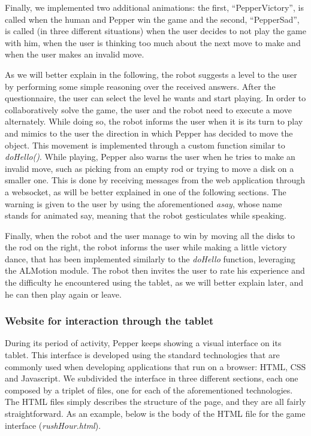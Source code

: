 \documentclass{article}
\begin{document}


Finally, we implemented two additional animations: the first, “PepperVictory”,  is called when the human and Pepper win the game and the second, “PepperSad”, is called (in three different situations) when the user decides to not play the game with him, when the user is thinking too much about the next move to make and when the user makes an invalid move. 








\noindent As we will better explain in the following, the robot suggests a level to the user by performing some simple reasoning over the received answers. After the questionnaire, the user can select the level he wants and start playing. In order to collaboratively solve the game, the user and the robot need to execute a move alternately. While doing so, the robot informs the user when it is its turn to play and mimics to the user the direction in which Pepper has decided to move the object. This movement is implemented through a custom function similar to \textit{doHello()}.
While playing, Pepper also warns the user when he tries to make an invalid move, such as picking from an empty rod or trying to move a disk on a smaller one. This is done by receiving messages from the web application through a websocket, as will be better explained in one of the following sections. The warning is given to the user by using the aforementioned \textit{asay}, whose name stands for animated say, meaning that the robot gesticulates while speaking.



\noindent Finally, when the robot and the user manage to win by moving all the disks to the rod on the right, the robot informs the user while making a little victory dance, that has been implemented similarly to the \textit{doHello} function, leveraging the ALMotion module. The robot then invites the user to rate his experience and the difficulty he encountered using the tablet, as we will better explain later, and he can then play again or leave.

\subsubsection{Website for interaction through the tablet}
During its period of activity, Pepper keeps showing a visual interface on its tablet. This interface is developed using the standard technologies that are commonly used when developing applications that run on a browser: HTML, CSS and Javascript. We subdivided the interface in three different sections, each one composed by a triplet of files, one for each of the aforementioned technologies. The HTML files simply describes the structure of the page, and they are all fairly straightforward. As an example, below is the body of the HTML file for the game interface (\textit{rushHour.html}).
\end{document}
